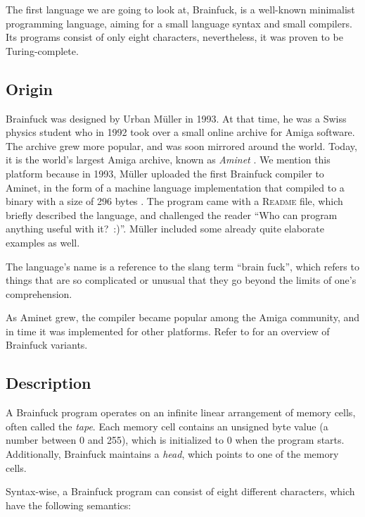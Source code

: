 The first language we are going to look at, Brainfuck, is a well-known minimalist programming language, aiming for a small language syntax and small compilers. Its programs consist of only eight characters, nevertheless, it was proven to be Turing-complete.

\subsection{Origin}

Brainfuck was designed by Urban Müller in 1993. At that time, he was a Swiss physics student who in 1992 took over a small online archive for Amiga software. The archive grew more popular, and was soon mirrored around the world. Today, it is the world's largest Amiga archive, known as \emph{Aminet} \cite{muller1993aminet}. We mention this platform because in 1993, Müller uploaded the first Brainfuck compiler to Aminet, in the form of a machine language implementation that compiled to a binary with a size of 296 bytes \cite{muller1993240}. The program came with a \textsc{Readme} file, which briefly described the language, and challenged the reader “Who can program anything useful with it?~:)”. Müller included some already quite elaborate examples as well.

The language's name is a reference to the slang term “brain fuck”, which refers to things that are so complicated or unusual that they go beyond the limits of one's comprehension.

As Aminet grew, the compiler became popular among the Amiga community, and in time it was implemented for other platforms. Refer to  for an overview of Brainfuck variants.

\subsection{Description}

A Brainfuck program operates on an infinite linear arrangement of memory cells, often called the \emph{tape}. Each memory cell contains an unsigned byte value (a number between 0 and 255), which is initialized to 0 when the program starts. Additionally, Brainfuck maintains a \emph{head}, which points to one of the memory cells.

Syntax-wise, a Brainfuck program can consist of eight different characters, which have the following semantics:

